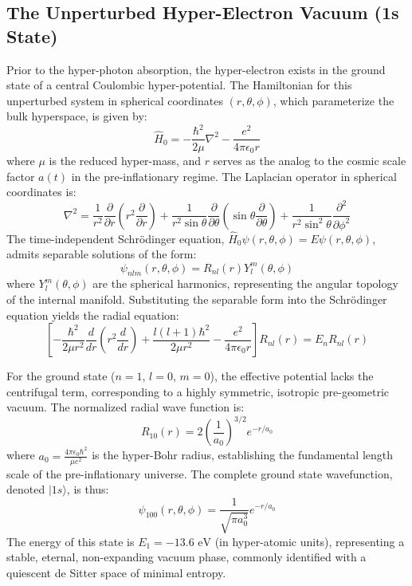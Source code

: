 \subsection{The Unperturbed Hyper-Electron Vacuum (1s State)}
Prior to the hyper-photon absorption, the hyper-electron exists in the ground state of a central Coulombic hyper-potential. The Hamiltonian for this unperturbed system in spherical coordinates $(r, \theta, \phi)$, which parameterize the bulk hyperspace, is given by:
\begin{equation}
\hat{H}_0 = -\frac{\hbar^2}{2\mu}\nabla^2 - \frac{e^2}{4\pi\epsilon_0 r}
\end{equation}
where $\mu$ is the reduced hyper-mass, and $r$ serves as the analog to the cosmic scale factor $a(t)$ in the pre-inflationary regime. The Laplacian operator in spherical coordinates is:
\begin{equation}
\nabla^2 = \frac{1}{r^2}\frac{\partial}{\partial r}\left(r^2 \frac{\partial}{\partial r}\right) + \frac{1}{r^2\sin\theta}\frac{\partial}{\partial \theta}\left(\sin\theta \frac{\partial}{\partial \theta}\right) + \frac{1}{r^2\sin^2\theta}\frac{\partial^2}{\partial \phi^2}
\end{equation}
The time-independent Schr\"odinger equation, $\hat{H}_0 \psi(r,\theta,\phi) = E \psi(r,\theta,\phi)$, admits separable solutions of the form:
\begin{equation}
\psi_{nlm}(r,\theta,\phi) = R_{nl}(r)Y_l^m(\theta,\phi)
\end{equation}
where $Y_l^m(\theta,\phi)$ are the spherical harmonics, representing the angular topology of the internal manifold. Substituting the separable form into the Schr\"odinger equation yields the radial equation:
\begin{equation}
\left[ -\frac{\hbar^2}{2\mu r^2}\frac{d}{dr}\left(r^2 \frac{d}{dr}\right) + \frac{l(l+1)\hbar^2}{2\mu r^2} - \frac{e^2}{4\pi\epsilon_0 r} \right] R_{nl}(r) = E_n R_{nl}(r)
\end{equation}

For the ground state ($n=1$, $l=0$, $m=0$), the effective potential lacks the centrifugal term, corresponding to a highly symmetric, isotropic pre-geometric vacuum. The normalized radial wave function is:
\begin{equation}
R_{10}(r) = 2\left(\frac{1}{a_0}\right)^{3/2} e^{-r/a_0}
\end{equation}
where $a_0 = \frac{4\pi\epsilon_0\hbar^2}{\mu e^2}$ is the hyper-Bohr radius, establishing the fundamental length scale of the pre-inflationary universe. The complete ground state wavefunction, denoted $|1s\rangle$, is thus:
\begin{equation}
\psi_{100}(r,\theta,\phi) = \frac{1}{\sqrt{\pi a_0^3}} e^{-r/a_0}
\end{equation}
The energy of this state is $E_1 = -13.6 \text{ eV}$ (in hyper-atomic units), representing a stable, eternal, non-expanding vacuum phase, commonly identified with a quiescent de Sitter space of minimal entropy.

